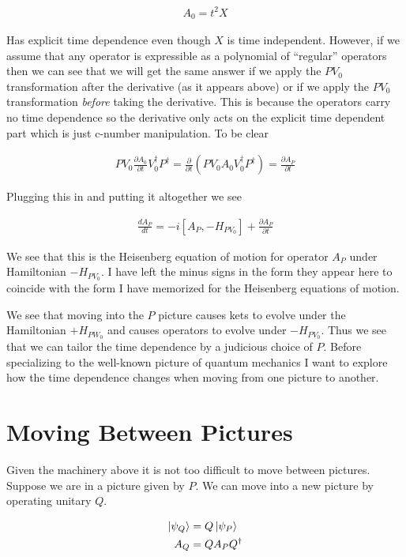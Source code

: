 \documentclass[12pt]{article}
\newcommand{\ddt}[1]{\frac{d #1}{dt}}
\newcommand{\ppt}[1]{\frac{\partial #1}{\partial t}}
\begin{document}
\begin{align}
A_0 = t^2 X
\end{align}

Has explicit time dependence even though $X$ is time independent. However, if we assume that any operator is expressible as a polynomial of ``regular'' operators then we can see that we will get the same answer if we apply the $PV_0$ transformation after the derivative (as it appears above) or if we apply the $PV_0$ transformation \textit{before} taking the derivative. This is because the operators carry no time dependence so the derivative only acts on the explicit time dependent part which is just c-number manipulation. To be clear

\begin{align}
PV_0 \ppt{A_0} V_0^{\dag}P^{\dag} = \ppt{}\left(PV_0A_0V_0^{\dag}P^{\dag} \right) = \ppt{A_P}
\end{align}

Plugging this in and putting it altogether we see

\begin{align}
\boxed{
\ddt{A_P} = -i[A_P,-H_{PV_0}] + \ppt{A_P}	
}
\end{align}

We see that this is the Heisenberg equation of motion for operator $A_P$ under Hamiltonian $-H_{PV_0}$. I have left the minus signs in the form they appear here to coincide with the form I have memorized for the Heisenberg equations of motion.

We see that moving into the $P$ picture causes kets to evolve under the Hamiltonian $+H_{PW_0}$ and causes operators to evolve under $-H_{PV_0}$. Thus we see that we can tailor the time dependence by a judicious choice of $P$. Before specializing to the well-known picture of quantum mechanics I want to explore how the time dependence changes when moving from one picture to another.

\section{Moving Between Pictures}

Given the machinery above it is not too difficult to move between pictures. Suppose we are in a picture given by $P$. We can move into a new picture by operating unitary $Q$.

\begin{align}
\ket{\psi_Q} &= Q \ket{\psi_P}\\
A_Q &= Q A_P Q^{\dag}
\end{align}
\end{document}
